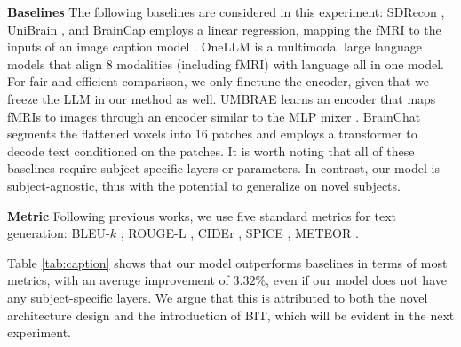 \noindent\textbf{Baselines}
The following baselines are considered in this experiment: SDRecon \cite{takagi2023high}, UniBrain \cite{mai2023unibrain}, and BrainCap \cite{ferrante2023brain} employs a linear regression, mapping the fMRI to the inputs of an image caption model \cite{li2023blip}. OneLLM \cite{han2024onellm} is a multimodal large language models that align $8$ modalities (including fMRI) with language all in one model. For fair and efficient comparison, we only finetune the encoder, given that we freeze the LLM in our method as well. UMBRAE learns an encoder that maps fMRIs to images through an encoder similar to the MLP mixer \cite{tolstikhin2021mlp}. BrainChat \cite{huang2024brainchat} segments the flattened voxels into 16 patches and employs a transformer to decode text conditioned on the patches.
It is worth noting that all of these baselines require subject-specific layers or parameters. In contrast, our model is subject-agnostic, thus with the potential to generalize on novel subjects.

\noindent\textbf{Metric} Following previous works, we use five standard metrics for text generation: BLEU-$k$ \cite{papineni2002bleu}, ROUGE-L \cite{lin2004rouge}, CIDEr \cite{vedantam2015cider}, SPICE \cite{anderson2016spice}, METEOR \cite{banerjee2005meteor}.

Table \ref{tab:caption} shows that our model outperforms baselines in terms of most metrics, with an average improvement of $3.32\%$, even if our model does not have any subject-specific layers. We argue that this is attributed to both the novel architecture design and the introduction of BIT, which will be evident in the next experiment.

